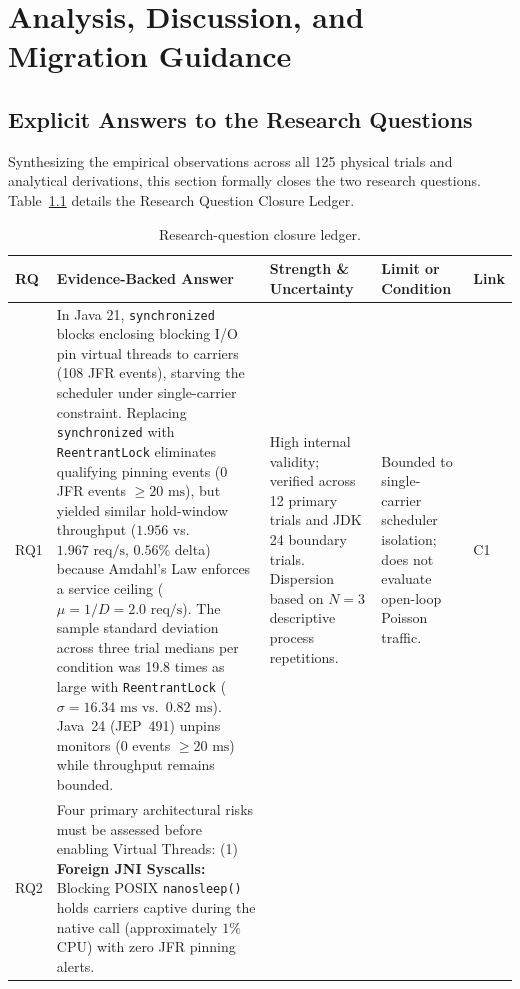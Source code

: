 \chapter{Analysis, Discussion, and Migration Guidance}
\label{ch:discussion}

\section{Explicit Answers to the Research Questions}
\label{sec:rq-closure}

Synthesizing the empirical observations across all 125 physical trials and analytical derivations, this section formally closes the two research questions. Table~\ref{tab:rq-closure} details the Research Question Closure Ledger.

\begin{table}[htbp]
  \centering
  \footnotesize
  \caption{Research-question closure ledger.}
  \label{tab:rq-closure}
  \begin{tabularx}{\textwidth}{@{}p{}>{\raggedright\arraybackslash}X>{\raggedright\arraybackslash}p{}>{\raggedright\arraybackslash}p{}p{}@{}}
    \toprule
    \textbf{RQ} & \textbf{Evidence-Backed Answer} & \textbf{Strength \& Uncertainty} & \textbf{Limit or Condition} & \textbf{Link} \\
    \midrule
    RQ1 & In Java 21, \texttt{synchronized} blocks enclosing blocking I/O pin virtual threads to carriers (108 JFR events), starving the scheduler under single-carrier constraint. Replacing \texttt{synchronized} with \texttt{ReentrantLock} eliminates qualifying pinning events (0 JFR events $\ge 20\text{ ms}$), but yielded similar hold-window throughput ($1.956$ vs.\ $1.967\text{ req/s}$, $0.56\%$ delta) because Amdahl's Law enforces a service ceiling ($\mu = 1/D = 2.0\text{ req/s}$). The sample standard deviation across three trial medians per condition was 19.8 times as large with \texttt{ReentrantLock} ($\sigma = 16.34\text{ ms}$ vs.\ $0.82\text{ ms}$). Java~24 (JEP~491) unpins monitors (0 events $\ge 20\text{ ms}$) while throughput remains bounded. & High internal validity; verified across 12 primary trials and JDK 24 boundary trials. Dispersion based on $N=3$ descriptive process repetitions. & Bounded to single-carrier scheduler isolation; does not evaluate open-loop Poisson traffic. & C1 \\
    \addlinespace
    RQ2 & Four primary architectural risks must be assessed before enabling Virtual Threads:
    (1) \textbf{Foreign JNI Syscalls:} Blocking POSIX \texttt{nanosleep()} holds carriers captive during the native call (approximately $1\%$ CPU) with zero JFR pinning alerts.

\end{tabularx}
\end{table}
